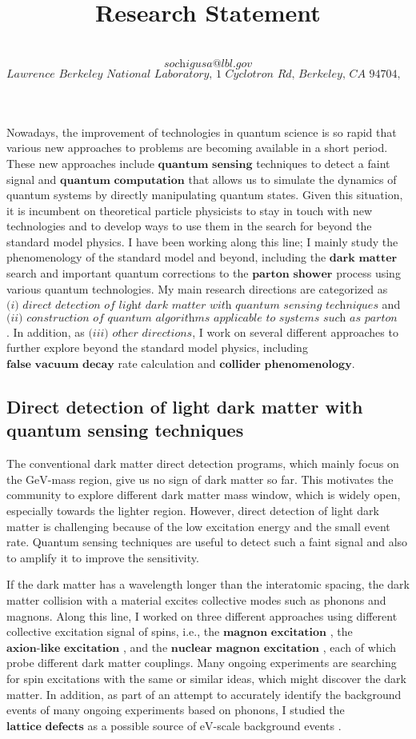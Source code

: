 \documentclass[12pt]{article}
\title{{\Large Research Statement}}
\author{
  \indent{\large So Chigusa}\\
  \indent$\textit{sochigusa@lbl.gov}$\\
  \indent$\textit{Lawrence Berkeley National Laboratory, 1 Cyclotron Rd, Berkeley, CA 94704, USA}$
}
\date{\vspace{-3em}}
\begin{document}
\maketitle

Nowadays, the improvement of technologies in quantum science is so rapid that various new approaches to problems are becoming available in a short period.
These new approaches include $\textbf{quantum sensing}$ techniques to detect a faint signal and $\textbf{quantum computation}$ that allows us to simulate the dynamics of quantum systems by directly manipulating quantum states.
Given this situation, it is incumbent on theoretical particle physicists to stay in touch with new technologies and to develop ways to use them in the search for beyond the standard model physics.
I have been working along this line; I mainly study the phenomenology of the standard model and beyond, including the $\textbf{dark matter}$ search and important quantum corrections to the $\textbf{parton shower}$ process using various quantum technologies. 
My main research directions are categorized as $\textit{(i) direct detection of light dark matter with quantum sensing techniques}$ and $\textit{(ii) construction of quantum algorithms applicable to systems such as parton shower}$.
In addition, as $\textit{(iii) other directions}$, I work on several different approaches to further explore beyond the standard model physics, including $\textbf{false vacuum decay}$ rate calculation and $\textbf{collider phenomenology}$.

\subsection*{Direct detection of light dark matter with quantum sensing techniques}

The conventional dark matter direct detection programs, which mainly focus on the $\mathrm{GeV}$-mass region, give us no sign of dark matter so far.
This motivates the community to explore different dark matter mass window, which is widely open, especially towards the lighter region.
However, direct detection of light dark matter is challenging because of the low excitation energy and the small event rate.
Quantum sensing techniques are useful to detect such a faint signal and also to amplify it to improve the sensitivity.

If the dark matter has a wavelength longer than the interatomic spacing, the dark matter collision with a material excites collective modes such as phonons and magnons.
Along this line, I worked on three different approaches using different collective excitation signal of spins, i.e., the $\textbf{magnon excitation}$ \cite{Chigusa:2020gfs}, the $\textbf{axion-like excitation}$ \cite{Chigusa:2021mci}, and the $\textbf{nuclear magnon excitation}$ \cite{Chigusa:2023hmz}, each of which probe different dark matter couplings.
Many ongoing experiments are searching for spin excitations with the same or similar ideas, which might discover the dark matter.
In addition, as part of an attempt to accurately identify the background events of many ongoing experiments based on phonons, I studied the $\textbf{lattice defects}$ as a possible source of $\mathrm{eV}$-scale background events \cite{Frenkel}.
\end{document}
